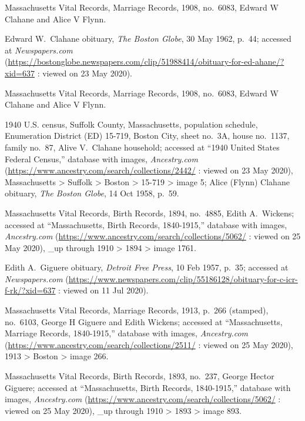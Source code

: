 \begin{thebibliography}{999}
Massachusetts Vital Records, Marriage Records, 1908, no.\ 6083, Edward W Clahane and Alice V Flynn.

Edward W.\ Clahane obituary, \textit{The Boston Globe}, 30 May 1962, p.\ 44; accessed at \textit{Newspapers.com} (\url{https://bostonglobe.newspapers.com/clip/51988414/obituary-for-ed-ahane/?xid=637} : viewed on 23 May 2020).

Massachusetts Vital Records, Marriage Records, 1908, no.\ 6083, Edward W Clahane and Alice V Flynn.

1940 U.S. census, Suffolk County, Massachusetts, population schedule, Enumeration District (ED) 15-719, Boston City, sheet no.\ 3A, house no.\ 1137, family no.\ 87, Alive V.\ Clahane household; accessed at ``1940 United States Federal Census,'' database with images, \textit{Ancestry.com} (\url{https://www.ancestry.com/search/collections/2442/} : viewed on 23 May 2020), Massachusetts > Suffolk > Boston > 15-719 > image 5; Alice (Flynn) Clahane obituary, \textit{The Boston Globe}, 14 Oct 1958, p.\ 59.


Massachusetts Vital Records, Birth Records, 1894, no.\ 4885, Edith A.\ Wickens; accessed at ``Massachusetts, Birth Records, 1840-1915,'' database with images, \textit{Ancestry.com} (\url{https://www.ancestry.com/search/collections/5062/} : viewed on 25 May 2020), \_up through 1910 > 1894 > image 1761.

Edith A.\ Giguere obituary, \textit{Detroit Free Press}, 10 Feb 1957, p.\ 35; accessed at \textit{Newspapers.com} (\url{https://www.newspapers.com/clip/55186128/obituary-for-c-icr-f-rk/?xid=637} : viewed on 11 Jul 2020).

Massachusetts Vital Records, Marriage Records, 1913, p.\ 266 (stamped), no.\ 6103, George H Giguere and Edith Wickens; accessed at ``Massachusetts, Marriage Records, 1840-1915,'' database with images, \textit{Ancestry.com} (\url{https://www.ancestry.com/search/collections/2511/} : viewed on 25 May 2020), 1913 > Boston > image 266.

Massachusetts Vital Records, Birth Records, 1893, no.\  237, George Hector Giguere; accessed at ``Massachusetts, Birth Records, 1840-1915,'' database with images, \textit{Ancestry.com} (\url{https://www.ancestry.com/search/collections/5062/} : viewed on 25 May 2020), \_up through 1910 > 1893 > image 893.


\end{thebibliography}
